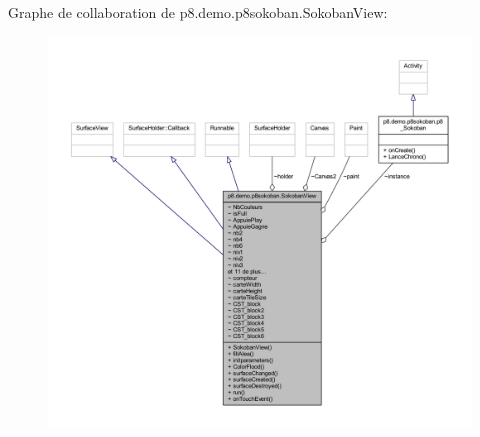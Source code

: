 Graphe de collaboration de p8.\+demo.\+p8sokoban.\+Sokoban\+View\+:
\nopagebreak
\begin{figure}[H]
\begin{center}
\leavevmode
\includegraphics[width=350pt]{classp8_1_1demo_1_1p8sokoban_1_1_sokoban_view__coll__graph}
\end{center}
\end{figure}
